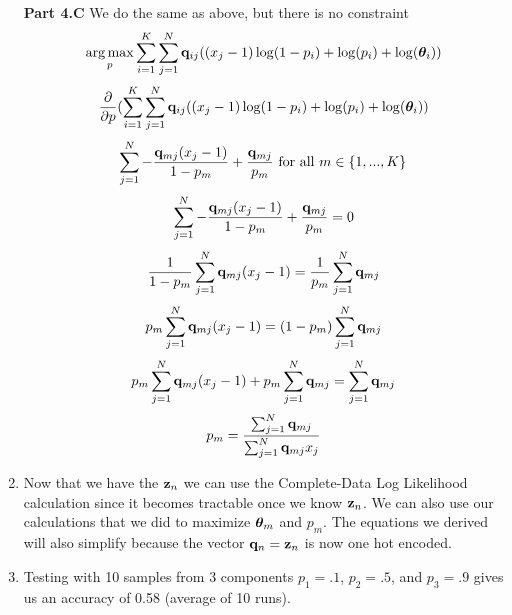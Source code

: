 \documentclass[submit]{harvardml}
\begin{document}
\begin{enumerate}
        
        \textbf{Part 4.C } \newline
        We do the same as above, but there is no constraint
        \begin{equation*}
            \underset{p}{\arg\max} \sum_{i=1}^K\sum_{j=1}^N \mathbf{q}_{ij} ((x_j -1) \log(1 - p_i) + \log(p_i) + \log(\boldsymbol{\theta}_{i}))
        \end{equation*}
        \begin{equation*}
            \frac{\partial}{\partial p}(\sum_{i=1}^K\sum_{j=1}^N \mathbf{q}_{ij} ((x_j -1) \log(1 - p_i) + \log(p_i) + \log(\boldsymbol{\theta}_{i}))
        \end{equation*}
        \begin{equation*}
            \sum_{j=1}^N -\frac{\mathbf{q}_{mj}(x_j -1)}{1 - p_m} + \frac{\mathbf{q}_{mj}}{p_m} \text{  for all  } m \in \{1, ..., K\}
        \end{equation*}
        \begin{equation*}
            \sum_{j=1}^N -\frac{\mathbf{q}_{mj}(x_j -1)}{1 - p_m} + \frac{\mathbf{q}_{mj}}{p_m} = 0
        \end{equation*}
        \begin{equation*}
            \frac{1}{1 - p_m} \sum_{j=1}^N \mathbf{q}_{mj}(x_j -1) = \frac{1}{p_m} \sum_{j=1}^N \mathbf{q}_{mj}
        \end{equation*}
        \begin{equation*}
            p_m \sum_{j=1}^N \mathbf{q}_{mj}(x_j -1) = (1-p_m) \sum_{j=1}^N \mathbf{q}_{mj}
        \end{equation*}
        \begin{equation*}
            p_m \sum_{j=1}^N \mathbf{q}_{mj}(x_j -1) + p_m \sum_{j=1}^N \mathbf{q}_{mj}= \sum_{j=1}^N \mathbf{q}_{mj}
        \end{equation*}
        \begin{equation*}
            p_m  = \frac{\sum_{j=1}^N \mathbf{q}_{mj}}{\sum_{j=1}^N \mathbf{q}_{mj}x_j}
        \end{equation*}
        
        \item
        Now that we have the $\mathbf{z}_n$ we can use the Complete-Data Log Likelihood calculation since it becomes tractable once we know $\mathbf{z}_n$. We can also use our calculations that we did to maximize $\boldsymbol{\theta}_m$ and $p_m$. The equations we derived will also simplify because the vector $\mathbf{q}_n = \mathbf{z}_n$ is now one hot encoded.
        
        \item 
        Testing with 10 samples from 3 components $p_1 = .1$, $p_2 = .5$, and $p_3 = .9$ gives us an accuracy of 0.58 (average of 10 runs).
        

\end{enumerate}
\end{document}
